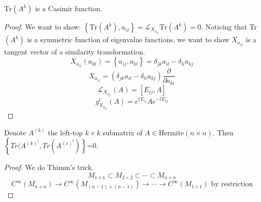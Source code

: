 \begin{lemma}
$\text{Tr}(A^k)$ is a Casimir function.
\end{lemma}
\begin{proof}
We want to show: $\left\{\text{Tr}(A^k),a_{ij}\right\}=\mathcal{L}_{X_{a_{ij}}}\text{Tr}(A^k)=0$. Noticing that Tr$(A^k)$ is a symmetric function of eigenvalue functions, we want to show $X_{a_{ij}}$ is a tangent vector of a similarity transformation.
\[X_{a_{ij}}(a_{kl})=\left\{a_{ij},a_{kl}\right\}=\delta_{jk}a_{il}-\delta_{li}a_{kj}\]
\[X_{a_{ij}}=(\delta_{jk}a_{il}-\delta_{li}a_{kj})\frac{\partial }{\partial a_{kl}} \]
\[\mathcal{L}_{X_{a_{ij}}}(A)=[E_{ij},A]\]
\[g^t_{X_{a_{ij}}}(A)=e^{tE_{ij}}Ae^{-tE_{ij}}\]
\end{proof}
\begin{theorem}
Denote $A^{(k)}$ the left-top $k\times k$ submatrix of $A\in\text{Hermite}(n\times n)$. Then $\left\{Tr(A^{(k)^j},Tr(A^{(s)^t})\right\}$=0.
\end{theorem}
\begin{proof}
We do Thimm's trick.
\[M_{1\times1}\subset M_{2\times2} \subset\cdots\subset M_{n\times n}\]
\[C^\infty(M_{n\times n})\longrightarrow C^\infty(M_{(n-1)\times (n-1)})\longrightarrow\cdots\longrightarrow C^\infty(M_{1\times 1})\text{ by restriction}\]
\end{proof}

